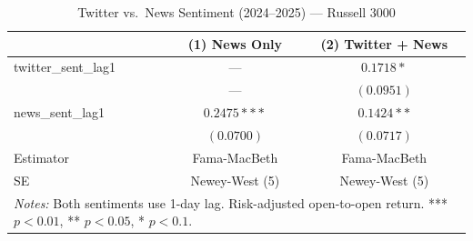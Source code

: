 \begin{table}[htbp]
\centering
\caption{Twitter vs.\ News Sentiment (2024--2025) --- Russell 3000}
\label{tab:russel_2024_t5}
\begin{tabular}{lcc}
\hline\hline
 & (1) News Only & (2) Twitter + News \\
\hline
twitter\_sent\_lag1 & --- & $0.1718*$ \\
                     & --- & $(0.0951)$ \\
news\_sent\_lag1    & $0.2475***$ & $0.1424**$ \\
                     & $(0.0700)$ & $(0.0717)$ \\
\hline
Estimator & Fama-MacBeth & Fama-MacBeth \\
SE & Newey-West (5) & Newey-West (5) \\
\hline\hline
\multicolumn{3}{p{0.9\linewidth}}{\footnotesize \textit{Notes:} Both sentiments use 1-day lag. Risk-adjusted open-to-open return. *** $p<0.01$, ** $p<0.05$, * $p<0.1$.}\n\end{tabular}
\end{table}